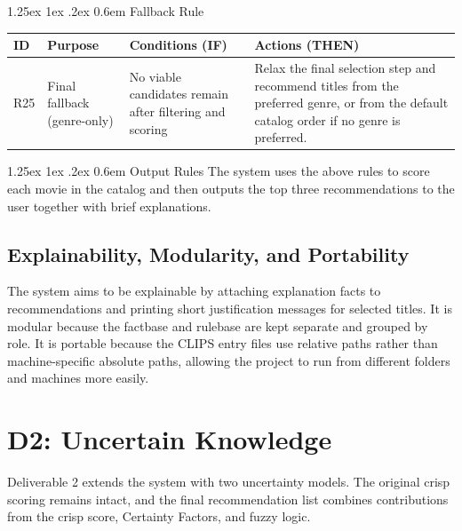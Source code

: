 \documentclass[11pt]{article}
\makeatletter
\renewcommand\paragraph{\@startsection{paragraph}{4}{\z@}%
  {1.25ex \@plus1ex \@minus.2ex}%
  {0.6em}%
  {\normalfont\normalsize\bfseries}}
\makeatother
\begin{document}
\paragraph{Fallback Rule}
\begin{tabularx}{\textwidth}{@{}l l X X@{}}
\toprule
\textbf{ID} & \textbf{Purpose} & \textbf{Conditions (IF)} & \textbf{Actions (THEN)} \\
\midrule
R25 & Final fallback (genre-only) &
No viable candidates remain after filtering and scoring &
Relax the final selection step and recommend titles from the preferred genre, or from the default catalog order if no genre is preferred. \\
\bottomrule
\end{tabularx}

\paragraph{Output Rules}
The system uses the above rules to score each movie in the catalog and then outputs the top three recommendations to the user together with brief explanations.

\subsection{Explainability, Modularity, and Portability}
The system aims to be explainable by attaching explanation facts to recommendations and printing short justification messages for selected titles. It is modular because the factbase and rulebase are kept separate and grouped by role. It is portable because the CLIPS entry files use relative paths rather than machine-specific absolute paths, allowing the project to run from different folders and machines more easily.

\section{D2: Uncertain Knowledge}
Deliverable 2 extends the system with two uncertainty models. The original crisp scoring remains intact, and the final recommendation list combines contributions from the crisp score, Certainty Factors, and fuzzy logic.
\end{document}
